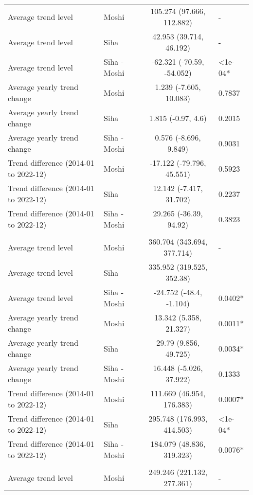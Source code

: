 \begin{longtable}{l|lcl}
\midrule\addlinespace[2.5pt]
\multicolumn{4}{l}{Other Cardiovascular Diseases} \\[2.5pt] 
\midrule\addlinespace[2.5pt]
Average trend level & Moshi & 105.274 (97.666, 112.882) & - \\ 
Average trend level & Siha & 42.953 (39.714, 46.192) & - \\ 
Average trend level & Siha - Moshi & -62.321 (-70.59, -54.052) & <1e-04* \\ 
Average yearly trend change & Moshi & 1.239 (-7.605, 10.083) & 0.7837 \\ 
Average yearly trend change & Siha & 1.815 (-0.97, 4.6) & 0.2015 \\ 
Average yearly trend change & Siha - Moshi & 0.576 (-8.696, 9.849) & 0.9031 \\ 
Trend difference (2014-01 to 2022-12) & Moshi & -17.122 (-79.796, 45.551) & 0.5923 \\ 
Trend difference (2014-01 to 2022-12) & Siha & 12.142 (-7.417, 31.702) & 0.2237 \\ 
Trend difference (2014-01 to 2022-12) & Siha - Moshi & 29.265 (-36.39, 94.92) & 0.3823 \\ 
\midrule\addlinespace[2.5pt]
\multicolumn{4}{l}{Peptic Ulcers} \\[2.5pt] 
\midrule\addlinespace[2.5pt]
Average trend level & Moshi & 360.704 (343.694, 377.714) & - \\ 
Average trend level & Siha & 335.952 (319.525, 352.38) & - \\ 
Average trend level & Siha - Moshi & -24.752 (-48.4, -1.104) & 0.0402* \\ 
Average yearly trend change & Moshi & 13.342 (5.358, 21.327) & 0.0011* \\ 
Average yearly trend change & Siha & 29.79 (9.856, 49.725) & 0.0034* \\ 
Average yearly trend change & Siha - Moshi & 16.448 (-5.026, 37.922) & 0.1333 \\ 
Trend difference (2014-01 to 2022-12) & Moshi & 111.669 (46.954, 176.383) & 0.0007* \\ 
Trend difference (2014-01 to 2022-12) & Siha & 295.748 (176.993, 414.503) & <1e-04* \\ 
Trend difference (2014-01 to 2022-12) & Siha - Moshi & 184.079 (48.836, 319.323) & 0.0076* \\ 
\midrule\addlinespace[2.5pt]
\multicolumn{4}{l}{Pneumonia, Severe} \\[2.5pt] 
\midrule\addlinespace[2.5pt]
Average trend level & Moshi & 249.246 (221.132, 277.361) & - \\ 

\end{longtable}
